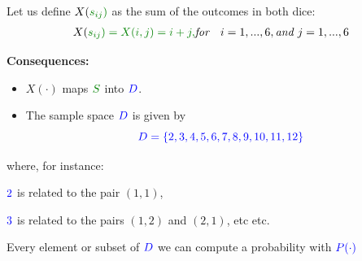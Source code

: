 \documentclass[smaller, handout]{beamer}\usepackage[]{graphicx}\usepackage[]{color}
\begin{document}
\begin{frame}{\secname}
  \begin{example}[continued]
  Let us define $X(\color{Mygreen}{s_{ij}})$ as the sum of the outcomes in both dice:
  \begin{eqnarray*}
  X(\color{Mygreen}{s_{ij}})= X(i,j)= i+j, & \textit{for} & i=1,...,6,  \textit{and  }   j=1,...,6
  \end{eqnarray*}

  \textbf{Consequences:}
  \begin{itemize}
  \item $X(\cdot)$ maps $\color{Mygreen} S \color{black}$ into $\color{blue}D\color{black}$.
  \item The sample space $\color{blue}D\color{black}$ is given by
  \begin{equation*}
  \color{blue}D=\left\{2,3,4,5,6,7,8,9,10,11,12\right\}\color{black}
  \end{equation*}
  \end{itemize}
  \vspace{-0.3cm}
  where, for instance:
  \begin{center}
  $\color{blue}2\color{black}$ is related to the pair $(1,1)$,

  $\color{blue}3\color{black}$ is related to the pairs $(1,2)$ and $(2,1)$, etc etc.

  Every element or subset of $\color{blue}{D}$ we can compute a probability with $\color{blue}{P(\cdot)}$
  \end{center}

  \end{example}
\end{frame}
\end{document}
